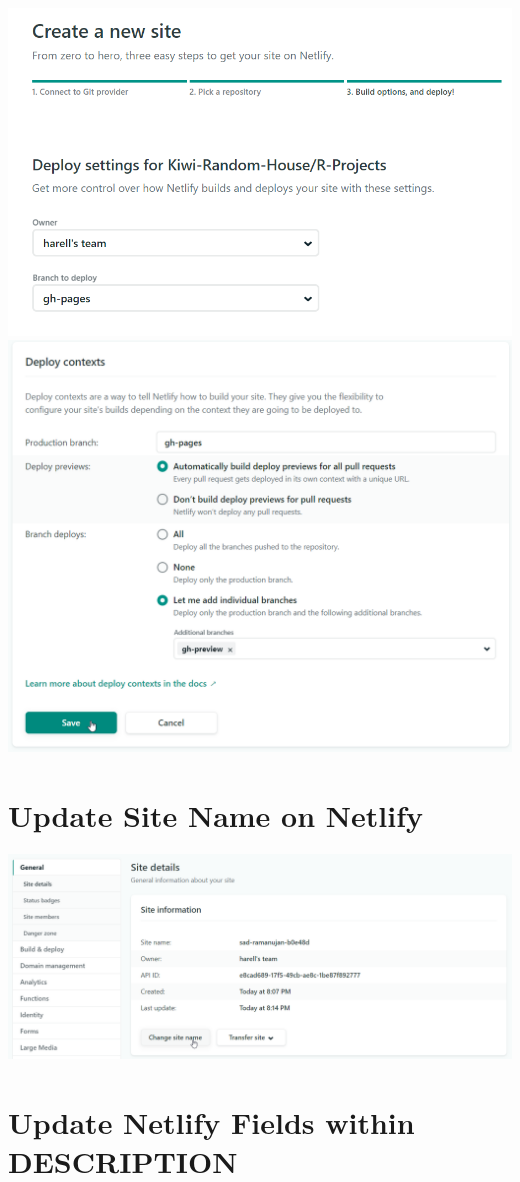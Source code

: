 \documentclass[]{book}
\begin{document}
\begin{center}\includegraphics[width=0.7\linewidth]{images/da630a35606ef9313dae374c8e8f1cd7} \includegraphics[width=0.7\linewidth]{images/5aae39e4fb32a148c6d8a59f2c87b5de} \end{center}

\hypertarget{update-site-name-on-netlify}{%
\section{Update Site Name on Netlify}\label{update-site-name-on-netlify}}

\begin{center}\includegraphics[width=0.7\linewidth]{images/4969813bdca8f1b44bd7b7cd5266ff36} \end{center}

\hypertarget{update-netlify-fields-within-description}{%
\section{Update Netlify Fields within DESCRIPTION}\label{update-netlify-fields-within-description}}
\end{document}
